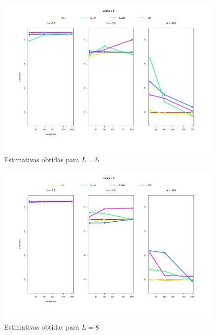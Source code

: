 \begin{figure}[H]
     \centering
     \includegraphics[scale=0.5]{plots/estimators_L=5.pdf}
     \caption{Estimativas obtidas para $L=5$}
     \label{graf_10}
\end{figure}
\begin{figure}[H]
     \centering
     \includegraphics[scale=0.5]{plots/estimators_L=8.pdf}
     \caption{Estimativas obtidas para $L=8$}
     \label{graf_11}
\end{figure}

